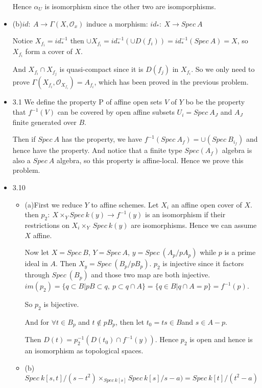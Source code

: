 \documentclass[12pt]{article}
\newcommand{\oda}{\mathcal{O}}
\begin{document}
\begin{itemize}
\begin{itemize}
\end{itemize}

Hence $\alpha_U$ is isomorphism since the other two are isomporphisms.

\item(b)$id: \ A\to \Gamma(X,\oda_x)$ induce a morphism: $id_*: \ X \to Spec \  A$

Notice $X_{f_i}=id_*^{-1}$ then $\cup X_{f_i}=id_*^{-1}(\cup D(f_i))=id_*^{-1}(Spec \  A)=X$, so $X_{f_i}$ form a cover of $X$.

And $X_{f_i} \cap X_{f_j}$ is quasi-compact since it is $D(f_j)$ in $X_{f_i}$. So we only need to prove $\Gamma(X_{f_i}, \oda_{X_{f_i}})=A_{f_i}$, which has been proved in the previous problem.
\item 3.1 We define the property P of affine open sets $V$ of $Y$ bo be the property that $f^{-1}(V)$ can be covered by open affine subsets $U_i=Spec \  A_J$ and $A_J$ finite generated over $B$.

Then if $Spec \ A$ has the property, we have $f^{-1}(Spec  \ A_f)=\cup(Spec \ B_{i_f})$ and hence have the property. And notice that a finite type $Spec (A_f)$ algebra is also a $Spec \ A$ algebra, so this property is affine-local. Hence we prove this problem.
\item 3.10 \begin{itemize}
\item (a)First we reduce $Y$ to affine schemes. Let $X_i$ an affine open cover of $X$. then $p_2: \ X \times _Y Spec  \ k(y) \to f^{-1}(y)$ is an isomorphism if their restrictions on $X_i \times  _Y \ Spec  \ k(y)$ are isomorphisms. Hence we can assume $X$ affine.

Now let $X=Spec \  B$, $Y=Spec \  A$, $y=Spec \ (A_p/pA_p)$ while $p$ is a prime ideal in $A$. Then $X_y=Spec \ (B_p/pB_p)$. $p_2$ is injective since it factors through $Spec \ (B_p)$ and those two map are both injective. $im(p_2)=\{ q\subset B|pB \subset q, \ p\subset q\cap A\}=\{q\in B|q \cap A=p\}=f^{-1}(p)$.

So $p_2$ is bijective.

And for $\forall t \in B_p$ and $t \notin pB_p$, then let $t_0=ts \in B$and $s \in A-p$.

Then $D(t)=p_2^{-1}(D(t_0)\cap f^{-1}(y))$. Hence $p_2$ is open and hence is an isomorphism as topological spaces.

\item (b)$Spec \ k[s,t]/(s-t^2) \times _{Spec \  k[s]} Spec  \ k[s]/s-a)=Spec  \ k[t]/(t^2-a)$


\end{itemize}
\end{itemize}
\end{document}
